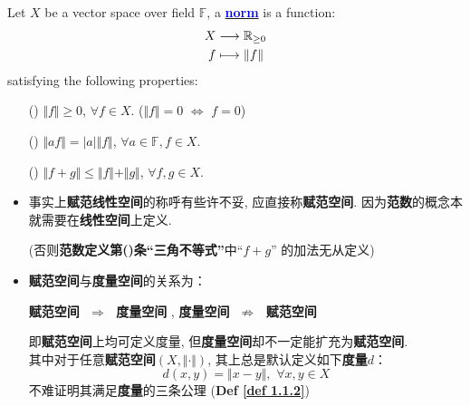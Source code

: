 	\begin{defn}\label{def 2.1.1}
		Let $X$ be a vector space over field $\mathbb{F}$, a \underline{\textcolor{blue}{\textbf{norm}}} is a function:
		\begin{align}
			X &\longrightarrow \mathbb{R}_{\geq 0} \\
			f &\longmapsto \Vert f \Vert
		\end{align}
		satisfying the following properties:
		\begin{enumerate}
			\item[(\rmnum{1})]$\Vert f \Vert \geq 0$, $\forall f \in X$. \hspace*{3em} ($\Vert f \Vert = 0 \,\, \Leftrightarrow \,\, f = 0$)
			
			\item[(\rmnum{2})]$\Vert af \Vert = \left| a \right| \Vert f \Vert$, $\forall a \in \mathbb{F}, f \in X$.
			
			\item[(\rmnum{3})]$\Vert f + g \Vert \leq \Vert f \Vert + \Vert g \Vert$, $\forall f , g \in X$.
		\end{enumerate}
		
		\vspace*{0.5em}
		
		\begin{rmk}
			\begin{itemize}
				\item 事实上\textbf{赋范线性空间}的称呼有些许不妥, 应直接称\textbf{赋范空间}. 因为\textbf{范数}的概念本就需要在\textbf{线性空间}上定义. 
				\begin{center}
					(否则\textbf{范数定义第()条“三角不等式”}中“$f + g$” 的加法无从定义)
				\end{center}
				
				\vspace*{2em}
				
				\item \textbf{赋范空间}与\textbf{度量空间}的关系为：
				\begin{center}
					\textbf{赋范空间} $\,\, \Rightarrow \,\,$ \textbf{度量空间} 
					\hspace*{1em} , \hspace*{1em} 
					\textbf{度量空间} $\,\, \not\Rightarrow \,\,$ \textbf{赋范空间}
				\end{center}
				即\textbf{赋范空间}上均可定义度量, 但\textbf{度量空间}却不一定能扩充为\textbf{赋范空间}. \\ 其中对于任意\textbf{赋范空间}$(X , \Vert \cdot \Vert)$, 其上总是默认定义如下\textbf{度量$d$}：
				\[ d(x , y) = \Vert x - y \Vert , \,\, \forall x , y \in X \]
				不难证明其满足\textbf{度量}的三条公理 (\textbf{Def \ref{def 1.1.2}})
				

\end{itemize}
\end{rmk}
\end{defn}
